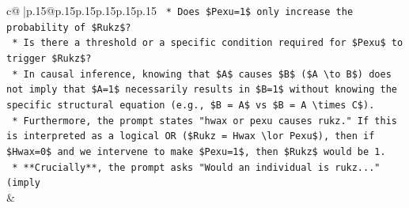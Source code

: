 \documentclass{article}
\begin{document}
{\begin{supertabular}{c@{$\;$}|p{.15\linewidth}@{}p{.15\linewidth}p{.15\linewidth}p{.15\linewidth}p{.15\linewidth}p{.15\linewidth}}
{{{\texttt{        *   Does \$Pexu=1\$ only increase the probability of \$Rukz\$?} \\
\texttt{        *   Is there a threshold or a specific condition required for \$Pexu\$ to trigger \$Rukz\$?} \\
\texttt{    *   In causal inference, knowing that \$A\$ causes \$B\$ (\$A \textbackslash{}to B\$) does not imply that \$A=1\$ necessarily results in \$B=1\$ without knowing the specific structural equation (e.g., \$B = A\$ vs \$B = A \textbackslash{}times C\$).} \\
\texttt{    *   Furthermore, the prompt states "hwax or pexu causes rukz." If this is interpreted as a logical OR (\$Rukz = Hwax \textbackslash{}lor Pexu\$), then if \$Hwax=0\$ and we intervene to make \$Pexu=1\$, then \$Rukz\$ would be 1.} \\
\texttt{    *   **Crucially**, the prompt asks "Would an individual is rukz..." (imply} \\
            }
        }
    }
    & \\ \\


\end{supertabular}}
\end{document}
